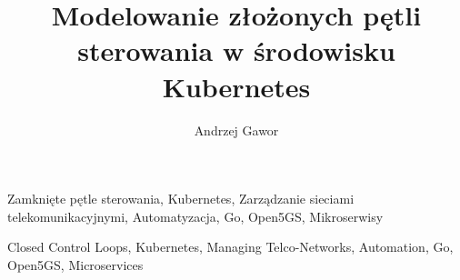 \documentclass[
    bindingoffset=5mm,  %
    footnoteindent=3mm, %
    hyphenation=true    %
]{src/wut-thesis}
\begin{document}
\title{
    Modelowanie złożonych pętli sterowania w środowisku Kubernetes
}
\author{Andrzej Gawor}
\date{\the\year}
\maketitle

\cleardoublepage
\abstract

\keywords Zamknięte pętle sterowania, Kubernetes, Zarządzanie sieciami telekomunikacyjnymi, Automatyzacja, Go, Open5GS, Mikroserwisy

\cleardoublepage
\secondabstract

\secondkeywords Closed Control Loops, Kubernetes, Managing Telco-Networks, Automation, Go, Open5GS, Microservices

\pagestyle{plain}

\cleardoublepage
\tableofcontents

\cleardoublepage 
\pagestyle{headings}







\cleardoublepage 
\printbibliography



\newpage
\pagestyle{plain}


\listoffigurestoc    
\vspace{1cm}         
\listoftablestoc     
\vspace{1cm}         
\listofappendicestoc 

\setcounter{tocdepth}{1}

\end{document}
